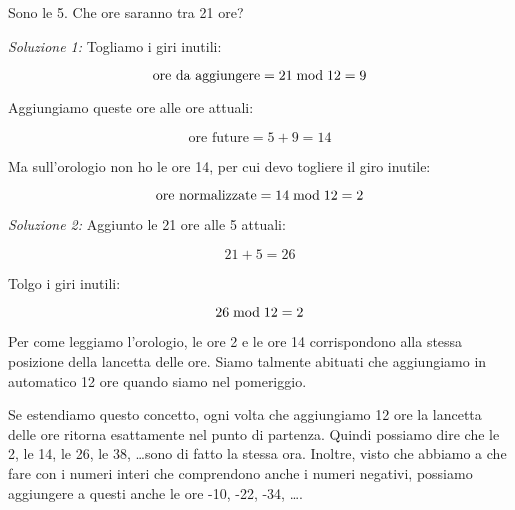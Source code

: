     \begin{esercizio}
        Sono le 5. Che ore saranno tra 21 ore?
    \end{esercizio}
    \begin{soluzione}
        \emph{Soluzione 1:}
        Togliamo i giri inutili:

        \begin{equation*}
            \text{ore da aggiungere} = 21  \bmod  12 = 9
        \end{equation*}

        Aggiungiamo queste ore alle ore attuali:

        \begin{equation*}
            \text{ore future} = 5 + 9 = 14
        \end{equation*}

        Ma sull'orologio non ho le ore 14, per cui devo togliere il giro inutile:

        \begin{equation*}
            \text{ore normalizzate} = 14  \bmod  12 = 2
        \end{equation*}
    \end{soluzione}
    \begin{soluzione}
        \emph{Soluzione 2:}
        Aggiunto le 21 ore alle 5 attuali:

        \begin{equation*}
            21 + 5 = 26
        \end{equation*}

        Tolgo i giri inutili:

        \begin{equation*}
            26  \bmod  12 = 2
        \end{equation*}
    \end{soluzione}

Per come leggiamo l'orologio, le ore 2 e le ore 14 corrispondono alla stessa posizione della lancetta delle ore. Siamo talmente abituati che aggiungiamo in automatico 12 ore quando siamo nel pomeriggio.

Se estendiamo questo concetto, ogni volta che aggiungiamo 12 ore la lancetta delle ore ritorna esattamente nel punto di partenza. Quindi possiamo dire che le 2, le 14, le 26, le 38, \dots sono di fatto la stessa ora. Inoltre, visto che abbiamo a che fare con i numeri interi che comprendono anche i numeri negativi, possiamo aggiungere a questi anche le ore -10, -22, -34, \dots.

